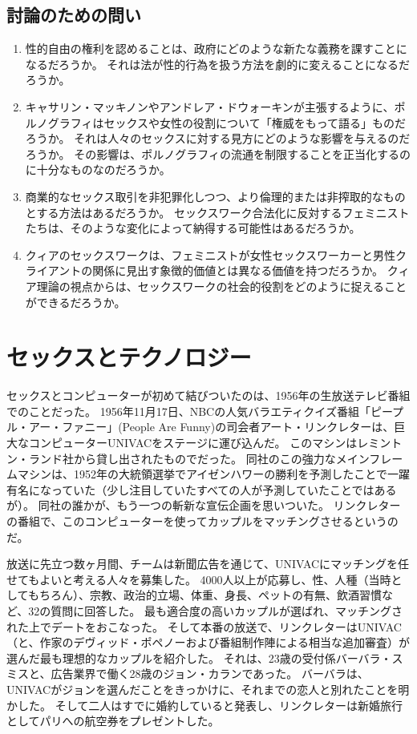 \documentclass[paper=a4,book,openany]{jlreq} \usepackage{mystyle}
\begin{document}
\section{討論のための問い}

\begin{enumerate}
    \item 性的自由の権利を認めることは、政府にどのような新たな義務を課すことになるだろうか。
それは法が性的行為を扱う方法を劇的に変えることになるだろうか。
    \item キャサリン・マッキノンやアンドレア・ドウォーキンが主張するように、ポルノグラフィはセックスや女性の役割について「権威をもって語る」ものだろうか。
それは人々のセックスに対する見方にどのような影響を与えるのだろうか。
その影響は、ポルノグラフィの流通を制限することを正当化するのに十分なものなのだろうか。
    \item 商業的なセックス取引を非犯罪化しつつ、より倫理的または非搾取的なものとする方法はあるだろうか。
セックスワーク合法化に反対するフェミニストたちは、そのような変化によって納得する可能性はあるだろうか。
    \item クィアのセックスワークは、フェミニストが女性セックスワーカーと男性クライアントの関係に見出す象徴的価値とは異なる価値を持つだろうか。
クィア理論の視点からは、セックスワークの社会的役割をどのように捉えることができるだろうか。
    \end{enumerate}

\chapter{セックスとテクノロジー}

セックスとコンピューターが初めて結びついたのは、1956年の生放送テレビ番組でのことだった。
1956年11月17日、NBCの人気バラエティクイズ番組「ピープル・アー・ファニー」(People Are Funny)の司会者アート・リンクレターは、巨大なコンピューターUNIVACをステージに運び込んだ。
このマシンはレミントン・ランド社から貸し出されたものでだった。
同社のこの強力なメインフレームマシンは、1952年の大統領選挙でアイゼンハワーの勝利を予測したことで一躍有名になっていた（少し注目していたすべての人が予測していたことではあるが）。
同社の誰かが、もう一つの斬新な宣伝企画を思いついた。
リンクレターの番組で、このコンピューターを使ってカップルをマッチングさせるというのだ。

放送に先立つ数ヶ月間、チームは新聞広告を通じて、UNIVACにマッチングを任せてもよいと考える人々を募集した。
4000人以上が応募し、性、人種（当時としてもちろん）、宗教、政治的立場、体重、身長、ペットの有無、飲酒習慣など、32の質問に回答した。
最も適合度の高いカップルが選ばれ、マッチングされた上でデートをおこなった。
そして本番の放送で、リンクレターはUNIVAC（と、作家のデヴィッド・ポペノーおよび番組制作陣による相当な追加審査）が選んだ最も理想的なカップルを紹介した。
それは、23歳の受付係バーバラ・スミスと、広告業界で働く28歳のジョン・カランであった。
バーバラは、UNIVACがジョンを選んだことをきっかけに、それまでの恋人と別れたことを明かした。
そして二人はすでに婚約していると発表し、リンクレターは新婚旅行としてパリへの航空券をプレゼントした。
\end{document}
